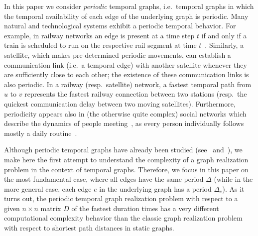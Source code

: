 \documentclass[a4paper,UKenglish,cleveref, autoref, thm-restate, anonymous]{lipics-v2021}
\begin{document}
In this paper we consider \emph{periodic} temporal graphs, i.e.~temporal graphs in which the temporal availability of each edge of the underlying graph is periodic. 
Many natural and technological systems exhibit a periodic temporal behavior. For example, in railway networks an edge is present at a time step $t$ if and
only if a train is scheduled to run on the respective rail segment at time $t$~\cite{Arrighi2023Multi}. 
Similarly, a satellite, which makes pre-determined periodic movements, can establish a communication link (i.e.~a temporal edge) with another satellite whenever they are sufficiently close to each other; the existence of these communication links is also periodic. 
In a railway (resp.~satellite) network, a fastest temporal path from $u$ to $v$ represents the fastest railway connection between two stations 
(resp.~the quickest communication delay between two moving satellites). 
Furthermore, periodicity appears also in (the otherwise quite complex) social networks which describe the dynamics of people meeting~\cite{snapnets,sapiezynski2015tracking}, as every person individually follows mostly a daily routine~\cite{Arrighi2023Multi}. 


Although periodic temporal graphs have already been studied 
(see~\cite[Class 8]{casteigts2012time} and~\cite{Arrighi2023Multi,ErlebachS20,morawietz2021timecop,morawietz2020timecop}), 
we make here the first attempt to understand the complexity of a graph realization problem in the context of temporal graphs. 
Therefore, we focus in this paper on the most fundamental case, where all edges have the same period $\Delta$ 
(while in the more general case, each edge $e$ in the underlying graph has a period $\Delta_e$).
As it turns out, the periodic temporal graph realization problem with respect to a given $n \times n$ matrix $D$ of the fastest duration times has a very different computational complexity behavior than the classic graph realization problem with respect to shortest path distances in static graphs. 









\end{document}
